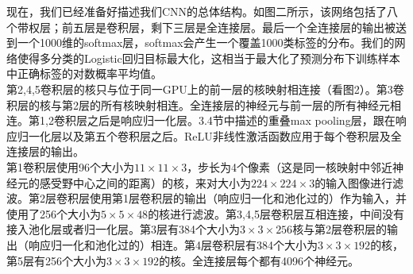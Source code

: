 现在，我们已经准备好描述我们CNN的总体结构。如图二所示，该网络包括了八个带权层；前五层是卷积层，剩下三层是全连接层。最后一个全连接层的输出被送到一个1000维的softmax层，softmax会产生一个覆盖1000类标签的分布。我们的网络使得多分类的Logistic回归目标最大化，这相当于最大化了预测分布下训练样本中正确标签的对数概率平均值。\\

第2,4,5卷积层的核只与位于同一GPU上的前一层的核映射相连接（看图2）。第3卷积层的核与第2层的所有核映射相连。全连接层的神经元与前一层的所有神经元相连。第1,2卷积层之后是响应归一化层。3.4节中描述的重叠max pooling层，跟在响应归一化层以及第五个卷积层之后。ReLU非线性激活函数应用于每个卷积层及全连接层的输出。\\

第1卷积层使用96个大小为$11\times11\times3$，步长为4个像素（这是同一核映射中邻近神经元的感受野中心之间的距离）的核，来对大小为$224\times224\times3$的输入图像进行滤波。第2层卷积层使用第1层卷积层的输出（响应归一化和池化过的）作为输入，并使用了256个大小为$5\times5\times48$的核进行滤波。第3,4,5层卷积层互相连接，中间没有接入池化层或者归一化层。第3层有384个大小为$3\times3\times256$核与第2层卷积层的输出（响应归一化和池化过的）相连。第4层卷积层有384个大小为$3\times3\times192$的核，第5层有256个大小为$3\times3\times192$的核。全连接层每个都有4096个神经元。\\